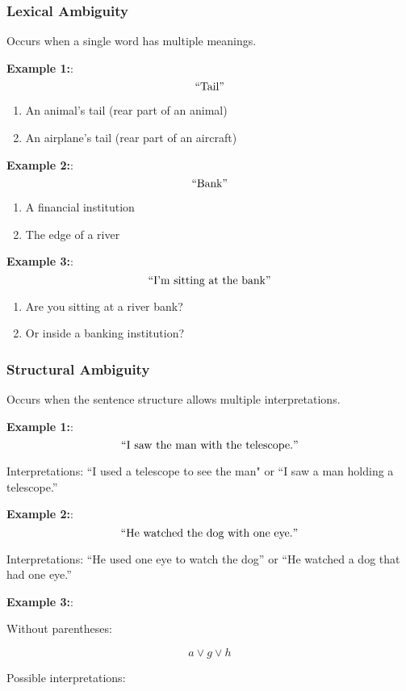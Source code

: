 \documentclass[12pt,a4paper,openany]{article}
\begin{document}
\subsubsection{Lexical Ambiguity}

Occurs when a single word has multiple meanings.

\textbf{Example 1:}: $$``\text{Tail}"$$

\begin{enumerate}
\item An animal's tail (rear part of an animal)
\item An airplane's tail (rear part of an aircraft)
\end{enumerate}

\textbf{Example 2:}: $$``\text{Bank}"$$

\begin{enumerate}
\item A financial institution
\item The edge of a river
\end{enumerate}

\textbf{Example 3:}: $$``\text{I'm sitting at the bank}"$$

\begin{enumerate}
\item Are you sitting at a river bank?
\item Or inside a banking institution?
\end{enumerate}

\subsubsection{Structural Ambiguity}

Occurs when the sentence structure allows multiple interpretations.

\textbf{Example 1:}: $$``\text{I saw the man with the telescope.}"$$

Interpretations: ``I used a telescope to see the man" or ``I saw a man holding a telescope.''

\textbf{Example 2:}: $$``\text{He watched the dog with one eye.}"$$

Interpretations: ``He used one eye to watch the dog'' or ``He watched a dog that had one eye.''

\textbf{Example 3:}:

Without parentheses:

\[
a \lor g \lor h
\]

Possible interpretations:
\end{document}
